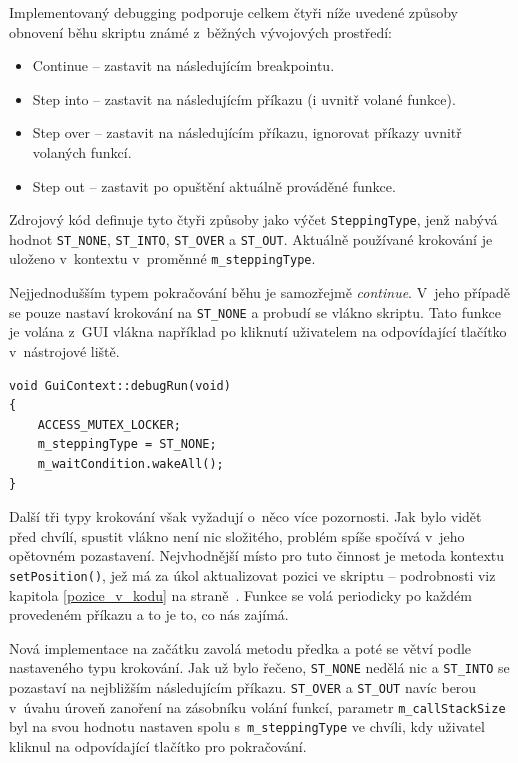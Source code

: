 \documentclass[11pt,twoside,a4paper]{book}
\begin{document}
Implementovaný debugging podporuje celkem čtyři níže uvedené způsoby obnovení běhu skriptu známé z~běžných vývojových prostředí:

\begin{itemize}
\item Continue -- zastavit na následujícím breakpointu.
\item Step into -- zastavit na následujícím příkazu (i uvnitř volané funkce).
\item Step over -- zastavit na následujícím příkazu, ignorovat příkazy uvnitř volaných funkcí.
\item Step out -- zastavit po opuštění aktuálně prováděné funkce.
\end{itemize}

Zdrojový kód definuje tyto čtyři způsoby jako výčet \texttt{SteppingType}, jenž nabývá hodnot \texttt{ST\_NONE}, \texttt{ST\_INTO}, \texttt{ST\_OVER} a \texttt{ST\_OUT}. Aktuálně používané krokování je uloženo v~kontextu v~proměnné \texttt{m\_step\-ping\-Type}.

Nejjednodušším typem pokračování běhu je samozřejmě \textit{continue}. V~jeho případě se pouze nastaví krokování na \texttt{ST\_NONE} a probudí se vlákno skriptu. Tato funkce je volána z~GUI vlákna například po kliknutí uživatelem na odpovídající tlačítko v~nástrojové liště.

\begin{verbatim}
void GuiContext::debugRun(void)
{
    ACCESS_MUTEX_LOCKER;
    m_steppingType = ST_NONE;
    m_waitCondition.wakeAll();
}
\end{verbatim}

Další tři typy krokování však vyžadují o~něco více pozornosti. Jak bylo vidět před chvílí, spustit vlákno není nic složitého, problém spíše spočívá v~jeho opětovném pozastavení. Nejvhodnější místo pro tuto činnost je metoda kontextu \texttt{setPosition()}, jež má za úkol aktualizovat pozici ve skriptu -- podrobnosti viz kapitola \ref{pozice_v_kodu} na straně~\pageref{pozice_v_kodu}. Funkce se volá periodicky po každém provedeném příkazu a to je to, co nás zajímá.

Nová implementace na začátku zavolá metodu předka a poté se větví podle nastaveného typu krokování. Jak už bylo řečeno, \texttt{ST\_NONE} nedělá nic a \texttt{ST\_INTO} se pozastaví na nejbližším následujícím příkazu. \texttt{ST\_OVER} a \texttt{ST\_OUT} navíc berou v~úvahu úroveň zanoření na zásobníku volání funkcí, parametr \texttt{m\_callStackSize} byl na svou hodnotu nastaven spolu s~\texttt{m\_steppingType} ve chvíli, kdy uživatel kliknul na odpovídající tlačítko pro pokračování.
\end{document}
